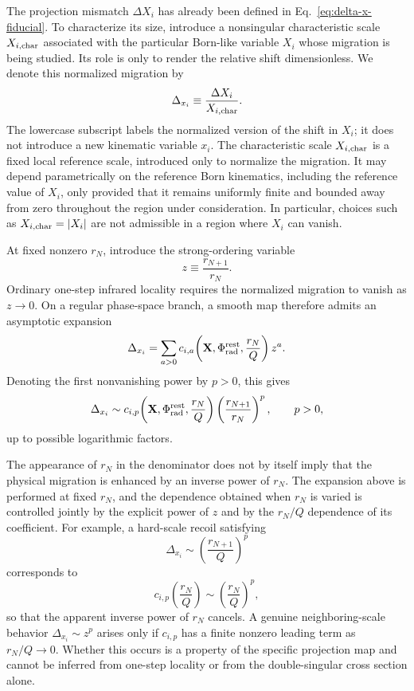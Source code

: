 \documentclass[11pt]{article}
\newcommand{\rn}{r_N}
\newcommand{\rnp}{r_{N+1}}
\newcommand{\Ph}{\Phi}
\begin{document}
The projection mismatch \(\Delta X_i\) has already been defined in Eq.~\eqref{eq:delta-x-fiducial}. To
characterize its size, introduce a nonsingular characteristic scale \(X_{i,\rm char}\) associated with the
particular Born-like variable \(X_i\) whose migration is being studied. Its role is only to render the relative
shift dimensionless. We denote this normalized migration by
\[
\Delta_{x_i}
\equiv
\frac{\Delta X_i}{X_{i,\rm char}}.
\]
The lowercase subscript labels the normalized version of the shift in \(X_i\); it does not introduce a new
kinematic variable \(x_i\). The characteristic scale \(X_{i,\rm char}\) is a fixed local reference scale,
introduced only to normalize the migration. It may depend parametrically on the reference Born kinematics,
including the reference value of \(X_i\), only provided that it remains uniformly finite and bounded away
from zero throughout the region under consideration. In particular, choices such as
\(X_{i,\rm char}=|X_i|\) are not admissible in a region where \(X_i\) can vanish.

At fixed nonzero \(\rn\), introduce the strong-ordering variable
\[
z\equiv\frac{\rnp}{\rn}.
\]
Ordinary one-step infrared locality requires the normalized migration to vanish as \(z\to0\). On a regular
phase-space branch, a smooth map therefore admits an asymptotic expansion
\[
\Delta_{x_i}
=
\sum_{a>0}
c_{i,a}\!\left(
\mathbf X,\Ph_{\rm rad}^{\rm rest},
\frac{\rn}{Q}
\right)z^a .
\]
Denoting the first nonvanishing power by \(p>0\), this gives
\begin{equation}
\Delta_{x_i}
\sim
c_{i,p}\!\left(
\mathbf X,\Ph_{\rm rad}^{\rm rest},
\frac{\rn}{Q}
\right)
\left(\frac{\rnp}{\rn}\right)^p,
\qquad p>0,
\label{eq:delta-x-scaling}
\end{equation}
up to possible logarithmic factors.

The appearance of \(\rn\) in the denominator does not by itself imply that the physical migration is
enhanced by an inverse power of \(\rn\). The expansion above is performed at fixed \(\rn\), and the
dependence obtained when \(\rn\) is varied is controlled jointly by the explicit power of \(z\) and by the
\(\rn/Q\) dependence of its coefficient. For example, a hard-scale recoil satisfying
\[
\Delta_{x_i}\sim
\left(\frac{\rnp}{Q}\right)^p
\]
corresponds to
\[
c_{i,p}\!\left(\frac{\rn}{Q}\right)
\sim
\left(\frac{\rn}{Q}\right)^p,
\]
so that the apparent inverse power of \(\rn\) cancels. A genuine neighboring-scale behavior
\(\Delta_{x_i}\sim z^p\) arises only if \(c_{i,p}\) has a finite nonzero leading term as
\(\rn/Q\to0\). Whether this occurs is a property of the specific projection map and cannot be inferred
from one-step locality or from the double-singular cross section alone.
\end{document}
